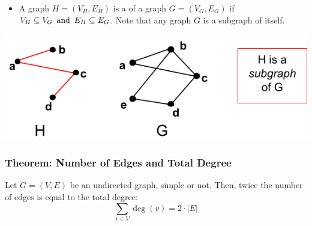 \begin{itemize}
  \item A graph $H = (V_H,E_H)$ is a  of a graph $G = (V_G,E_G)$ if $V_H \subseteq V_G \operatorname{~\text{and}~} E_H \subseteq E_G$. Note that any graph $G$ is a subgraph of itself.
\end{itemize}
\begin{center}
  \includegraphics[width=.6\linewidth]{resources/H is a subgraph of G.png}
\end{center}

\subsubsection*{Theorem: Number of Edges and Total Degree}
Let $G = (V,E)$ be an undirected graph, simple or not. Then, twice the number of edges is equal to the total degree:
\[
  \sum_{v \in V} \deg(v) = 2 \cdot |E|
\]

